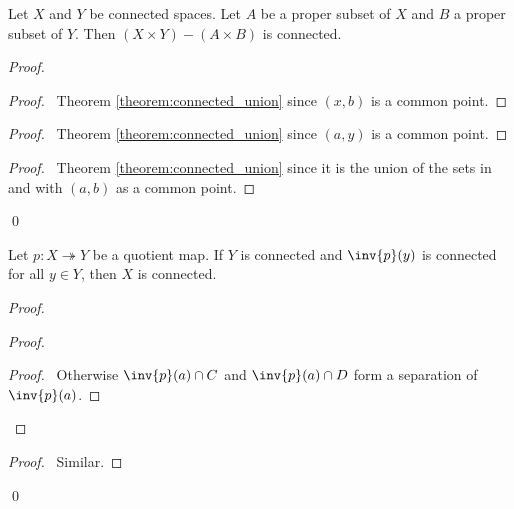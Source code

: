 \begin{proposition}
    Let $X$ and $Y$ be connected spaces. Let $A$ be a proper subset of $X$ and $B$ a proper subset of $Y$. Then $(X \times Y) - (A \times B)$ is connected.
\end{proposition}

\begin{proof}
    \pf
    \begin{proof}
        \pf\ Theorem \ref{theorem:connected_union} since $(x,b)$ is a common point.
    \end{proof}
    \begin{proof}
        \pf\ Theorem \ref{theorem:connected_union} since $(a,y)$ is a common point.
    \end{proof}
    \begin{proof}
        \pf\ Theorem \ref{theorem:connected_union} since it is the union of the sets in  and  with $(a,b)$ as a common point.
    \end{proof}
    \qed
\end{proof}

\begin{proposition}
    Let $p : X \twoheadrightarrow Y$ be a quotient map. If $Y$ is connected and $\inv{p}(y)$ is connected for all $y \in Y$, then $X$ is connected.
\end{proposition}

\begin{proof}
    \pf
    \begin{proof}
        \begin{proof}
            \pf\ Otherwise $\inv{p}(a) \cap C$ and $\inv{p}(a) \cap D$ form a separation of $\inv{p}(a)$.
        \end{proof}
    \end{proof}
    \begin{proof}
        \pf\ Similar.
    \end{proof}
    \qed
\end{proof}

